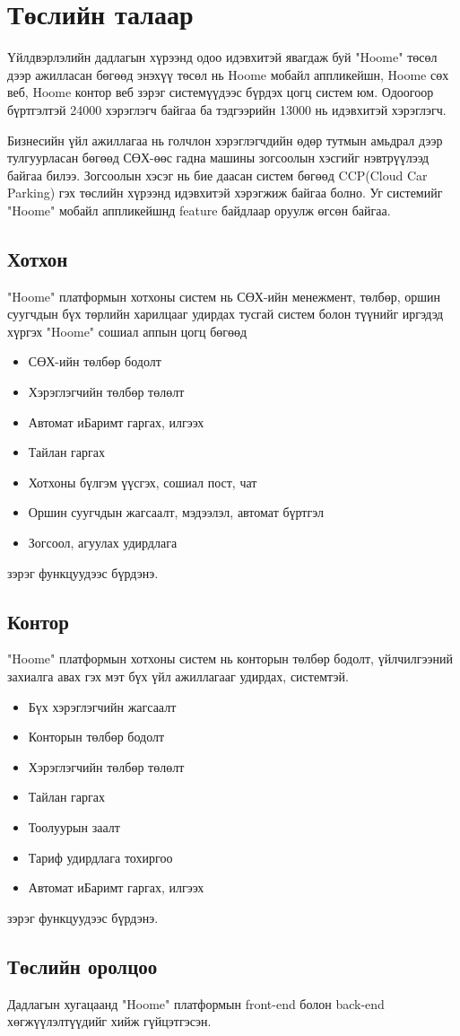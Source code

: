 \chapter{Төслийн талаар}

\hspace{0.5cm}
Үйлдвэрлэлийн дадлагын хүрээнд одоо идэвхитэй явагдаж буй "Hoome" төсөл дээр ажилласан бөгөөд энэхүү төсөл нь Hoome мобайл аппликейшн, Hoome сөх веб, Hoome контор веб зэрэг системүүдээс бүрдэх цогц систем юм. Одоогоор бүртгэлтэй 24000 хэрэглэгч байгаа ба тэдгээрийн 13000 нь идэвхитэй хэрэглэгч. 

Бизнесийн үйл ажиллагаа нь голчлон хэрэглэгчдийн өдөр тутмын амьдрал дээр тулгуурласан бөгөөд СӨХ-өөс гадна машины зогсоолын хэсгийг нэвтрүүлээд байгаа билээ. Зогсоолын хэсэг нь бие даасан систем бөгөөд CCP(Cloud Car Parking) гэх төслийн хүрээнд идэвхитэй хэрэгжиж байгаа болно. Уг системийг "Hoome" мобайл аппликейшнд feature байдлаар оруулж өгсөн байгаа. 


\section{Хотхон}
"Hoome" платформын хотхоны систем нь СӨХ-ийн менежмент, төлбөр, оршин суугчдын бүх төрлийн харилцааг удирдах тусгай систем болон түүнийг иргэдэд хүргэх "Hoome" сошиал аппын цогц бөгөөд
\begin{itemize}
  \item СӨХ-ийн төлбөр бодолт
  \item Хэрэглэгчийн төлбөр төлөлт
  \item Автомат иБаримт гаргах, илгээх
  \item Тайлан гаргах
  \item Хотхоны бүлгэм үүсгэх, сошиал пост, чат
  \item Оршин суугчдын жагсаалт, мэдээлэл, автомат бүртгэл
  \item Зогсоол, агуулах удирдлага
\end{itemize}
зэрэг функцуудээс бүрдэнэ.

\section{Контор}
"Hoome" платформын хотхоны систем нь конторын төлбөр бодолт, үйлчилгээний захиалга авах гэх мэт бүх үйл ажиллагааг удирдах, системтэй.
\begin{itemize}
  \item Бүх хэрэглэгчийн жагсаалт
  \item Конторын төлбөр бодолт
  \item Хэрэглэгчийн төлбөр төлөлт
  \item Тайлан гаргах
  \item Тоолуурын заалт
  \item Тариф удирдлага тохиргоо
  \item Автомат иБаримт гаргах, илгээх
\end{itemize}
зэрэг функцуудээс бүрдэнэ.

\section{Төслийн оролцоо}
Дадлагын хугацаанд "Hoome" платформын front-end болон back-end хөгжүүлэлтүүдийг хийж гүйцэтгэсэн. 


